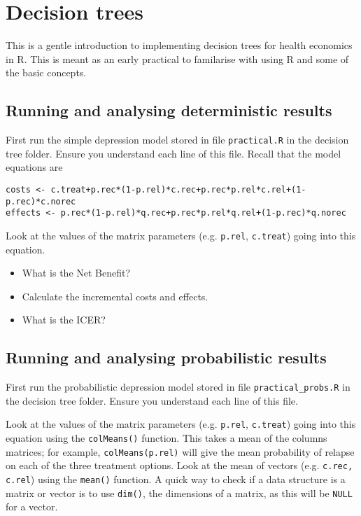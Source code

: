 \chapter{Decision trees}
This is a gentle introduction to implementing decision trees for health economics in R.
This is meant as an early practical to familarise with using R and some of the basic concepts.

\section{Running and analysing deterministic results}
First run the simple depression model stored in file \texttt{practical.R} in the decision tree folder. Ensure you understand each line of this file.
Recall that the model equations are

\begin{verbatim}
costs <- c.treat+p.rec*(1-p.rel)*c.rec+p.rec*p.rel*c.rel+(1-p.rec)*c.norec
effects <- p.rec*(1-p.rel)*q.rec+p.rec*p.rel*q.rel+(1-p.rec)*q.norec
\end{verbatim}

Look at the values of the matrix parameters (e.g. \texttt{p.rel}, \texttt{c.treat}) going into this equation.

\begin{itemize}
\item What is the Net Benefit?
\item Calculate the incremental costs and effects.
\item What is the ICER?
\end{itemize}


\section{Running and analysing probabilistic results}
First run the probabilistic depression model stored in file \texttt{practical\_probs.R} in the decision tree folder. Ensure you understand each line of this file.

Look at the values of the matrix parameters (e.g. \texttt{p.rel}, \texttt{c.treat}) going into this equation using the \texttt{colMeans()} function.
This takes a mean of the columns matrices; for example, \texttt{colMeans(p.rel)} will give the mean probability of relapse on each of the three treatment options.
Look at the mean of vectors (e.g. \texttt{c.rec, c.rel}) using the \texttt{mean()} function.
A quick way to check if a data structure is a matrix or vector is to use \texttt{dim()}, the dimensions of a matrix, as this will be \texttt{NULL} for a vector.

